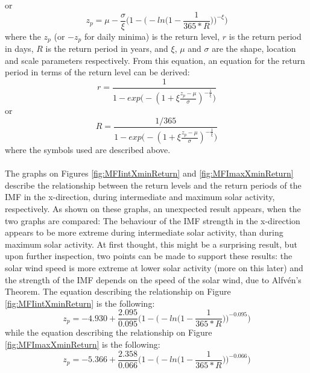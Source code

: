\documentclass[12pt]{article}
\begin{document}
        or
        \begin{equation}
            z_p = \mu-\frac{\sigma}{\xi}\Bigg( 1-\Bigg( -ln\Bigg( 1-\frac{1}{365*R}\Bigg) \Bigg) ^{-\xi}\Bigg)
        \end{equation}
        where the $z_p$ (or $-z_p$ for daily minima) is the return level, $r$ is the return period in days, $R$ is the return period in years, and $\xi$, $\mu$ and $\sigma$ are the shape, location and scale parameters respectively. From this equation, an equation for the return period in terms of the return level can be derived:
        \begin{equation}
            r=\frac{1}{1-exp\Bigg( -(1+\xi \frac{z_p-\mu}{\sigma})^{-\frac{1}{\xi}}\Bigg) }
        \end{equation}
        or
        \begin{equation}
            R=\frac{1/365}{1-exp\Bigg( -(1+\xi \frac{z_p-\mu}{\sigma})^{-\frac{1}{\xi}}\Bigg) }
        \end{equation}
        where the symbols used are described above.\\ \\
        The graphs on Figures \ref{fig:MFIintXminReturn} and \ref{fig:MFImaxXminReturn} describe the relationship between the return levels and the return periods of the IMF in the x-direction, during intermediate and maximum solar activity, respectively. As shown on these graphs, an unexpected result appears, when the two graphs are compared: The behaviour of the IMF strength in the x-direction appears to be more extreme during intermediate solar activity, than during maximum solar activity. At first thought, this might be a surprising result, but upon further inspection, two points can be made to support these results: the solar wind speed is more extreme at lower solar activity (more on this later) and the strength of the IMF depends on the speed of the solar wind, due to Alfvén's Theorem\cite{1976alfven}.
        The equation describing the relationship on Figure \ref{fig:MFIintXminReturn} is the following:
        \begin{equation}
            z_p =-4.930+\frac{2.095}{0.095}\Bigg( 1-\Bigg( -ln\Bigg( 1-\frac{1}{365*R}\Bigg) \Bigg) ^{-0.095}\Bigg)
        \end{equation}
        while the equation describing the relationship on Figure \ref{fig:MFImaxXminReturn} is the following:
        \begin{equation}
            z_p = -5.366+\frac{2.358}{0.066}\Bigg( 1-\Bigg( -ln\Bigg( 1-\frac{1}{365*R}\Bigg) \Bigg) ^{-0.066}\Bigg)
        \end{equation}\\ \\
\end{document}
